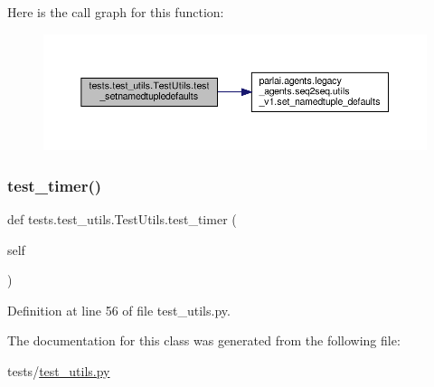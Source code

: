 Here is the call graph for this function\+:
\nopagebreak
\begin{figure}[H]
\begin{center}
\leavevmode
\includegraphics[width=350pt]{classtests_1_1test__utils_1_1TestUtils_a211bff449c261cce734e51e3a937d1af_cgraph}
\end{center}
\end{figure}
\mbox{\label{classtests_1_1test__utils_1_1TestUtils_aa4b5f19e38d6da7a8947226c60007184}} 
\subsubsection{\texorpdfstring{test\+\_\+timer()}{test\_timer()}}
{\footnotesize\ttfamily def tests.\+test\+\_\+utils.\+Test\+Utils.\+test\+\_\+timer (\begin{DoxyParamCaption}\item[{}]{self }\end{DoxyParamCaption})}



Definition at line 56 of file test\+\_\+utils.\+py.



The documentation for this class was generated from the following file\+:\begin{DoxyCompactItemize}
\item 
tests/\hyperlink{test__utils_8py}{test\+\_\+utils.\+py}\end{DoxyCompactItemize}
